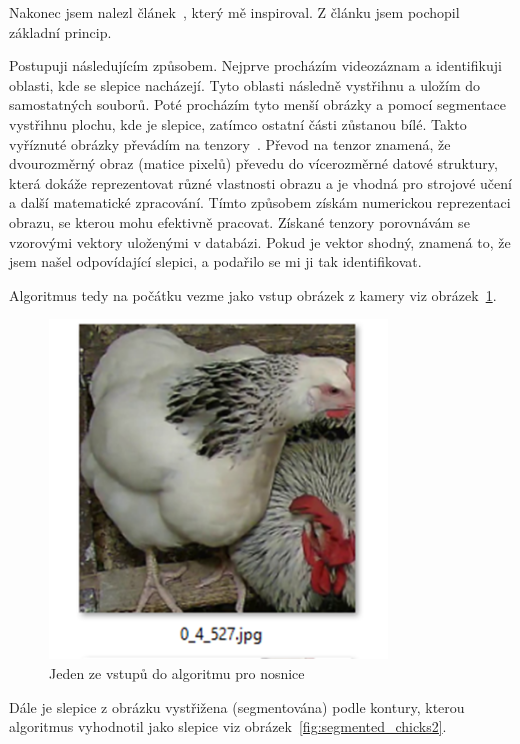 Nakonec jsem nalezl článek~\cite{medium-person-reidentification}, který mě inspiroval. Z článku jsem pochopil základní princip.

Postupuji následujícím způsobem.
Nejprve procházím videozáznam a identifikuji oblasti, kde se slepice nacházejí.
Tyto oblasti následně vystřihnu a uložím do samostatných souborů.
Poté procházím tyto menší obrázky a pomocí segmentace vystřihnu plochu, kde je slepice, zatímco ostatní části zůstanou bílé.
Takto vyříznuté obrázky převádím na tenzory~\cite{Tenzor}.
Převod na tenzor znamená, že dvourozměrný obraz (matice pixelů) převedu do vícerozměrné datové struktury, která dokáže reprezentovat různé vlastnosti obrazu a je vhodná pro strojové učení a další matematické zpracování.
Tímto způsobem získám numerickou reprezentaci obrazu, se kterou mohu efektivně pracovat.
Získané tenzory porovnávám se vzorovými vektory uloženými v databázi.
Pokud je vektor shodný, znamená to, že jsem našel odpovídající slepici, a podařilo se mi ji tak identifikovat.

Algoritmus tedy na počátku vezme jako vstup obrázek z kamery viz obrázek~\ref{fig:source_chick_image}.

\begin{figure}[H]
    \centering
    \includegraphics[width=0.8\textwidth]{img/source_chick_image}
    \caption{Jeden ze vstupů do algoritmu pro nosnice}
    \label{fig:source_chick_image}
\end{figure}

Dále je slepice z obrázku vystřižena (segmentována) podle kontury, kterou algoritmus vyhodnotil jako slepice viz obrázek~\ref{fig:segmented_chicks2}.

